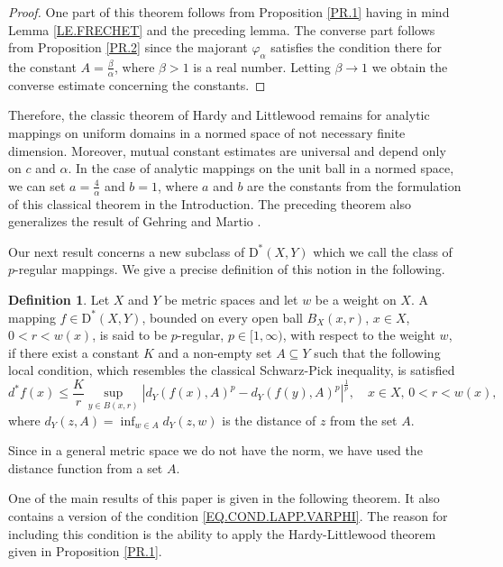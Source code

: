 \documentclass{amsart}
\theoremstyle{definition}
\newtheorem{definition}[theorem]{Definition}
\numberwithin{equation}{section}
\begin{document}
\begin{proof}
One part of this theorem follows from Proposition \ref{PR.1} having in mind Lemma \ref{LE.FRECHET} and the preceding
lemma. The converse part follows from Proposition \ref{PR.2} since the majorant $\varphi_\alpha$ satisfies the condition
there for the constant $A = \frac{\beta}{\alpha}$, where $\beta>1$ is a real number. Letting $\beta\to 1$ we obtain the
converse estimate concerning the constants.
\end{proof}

Therefore, the classic theorem of Hardy and Littlewood remains for analytic mappings on uniform domains in a normed
space of not necessary finite dimension. Moreover, mutual constant estimates are universal and depend only on $c$ and
$\alpha$. In the case of analytic mappings on the unit ball in a normed space, we can set $a = \frac {4}{\alpha}$ and
$b = 1$, where $a$ and $b$ are the constants from the formulation of this classical theorem in the Introduction. The
preceding theorem also generalizes the result of Gehring and Martio \cite{GEHRING.CV}.


\medskip

Our next result concerns a new subclass of $\mathrm {D}^\ast (X,Y)$ which we call the class of $p$-regular mappings.
We give a precise definition of this notion in the following.

\begin{definition}\label{DEF.P-REGULAR}
Let $X$ and $Y$ be metric spaces and let $w$ be a weight on $X$. A mapping $f\in\mathrm {D}^\ast(X,Y)$, bounded on
every open ball $B_X(x,r)$, $x\in X$, $0<r<w(x)$, is said to be $p$-regular, $p\in [1,\infty)$, with respect to the
weight $w$, if there exist a constant $K$ and a non-empty set $A\subseteq Y$ such that the following local condition,
which resembles the classical Schwarz-Pick inequality, is satisfied
\begin{equation*}
d^\ast f (x) \le \frac {K}r 
\sup_{y\in B(x,r)} |d_Y(f(x), A) ^p  -  d _Y(f(y), A)^p|^{\frac 1p},
\quad x\in X,\, 0<r<w(x),
\end{equation*}
where   $d_Y(z, A) = \inf_{w\in A} d_Y(z,w)$ is the distance  of $z$ from the set $A$.
\end{definition}

Since in a general metric space we do not have the norm, we have used the distance function from a set $A$.

One of the main results of this paper is given in the following theorem. It also contains a version of the condition
\eqref{EQ.COND.LAPP.VARPHI}. The reason for including this condition is the ability to apply the Hardy-Littlewood
theorem given in Proposition \ref{PR.1}.
\end{document}
